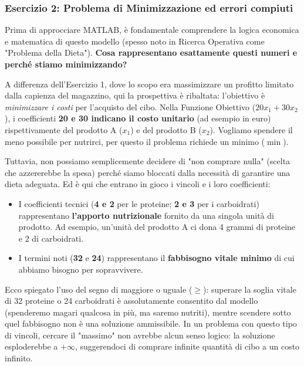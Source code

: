 \documentclass[12pt, a4paper]{article}
\begin{document}
	\vspace{0.6cm}
	
	\subsubsection*{Esercizio 2: Problema di Minimizzazione ed errori compiuti}
	Prima di approcciare MATLAB, è fondamentale comprendere la logica economica e matematica di questo modello (spesso noto in Ricerca Operativa come "Problema della Dieta"). \textbf{Cosa rappresentano esattamente questi numeri e perché stiamo minimizzando?} 
	
	A differenza dell'Esercizio 1, dove lo scopo era massimizzare un profitto limitato dalla capienza del magazzino, qui la prospettiva è ribaltata: l'obiettivo è \textit{minimizzare i costi} per l'acquisto del cibo. 
	Nella Funzione Obiettivo ($20x_1 + 30x_2$), i coefficienti \textbf{20 e 30 indicano il costo unitario} (ad esempio in euro) rispettivamente del prodotto A ($x_1$) e del prodotto B ($x_2$). Vogliamo spendere il meno possibile per nutrirci, per questo il problema richiede un minimo ($\min$).
	
	Tuttavia, non possiamo semplicemente decidere di "non comprare nulla" (scelta che azzererebbe la spesa) perché siamo bloccati dalla necessità di garantire una dieta adeguata. Ed è qui che entrano in gioco i vincoli e i loro coefficienti:
	\begin{itemize}
		\item I coefficienti tecnici (\textbf{4 e 2} per le proteine; \textbf{2 e 3} per i carboidrati) rappresentano \textbf{l'apporto nutrizionale} fornito da una singola unità di prodotto. Ad esempio, un'unità del prodotto A ci dona 4 grammi di proteine e 2 di carboidrati.
		\item I termini noti (\textbf{32} e \textbf{24}) rappresentano il \textbf{fabbisogno vitale minimo} di cui abbiamo bisogno per sopravvivere.
	\end{itemize}
	
	Ecco spiegato l'uso del segno di maggiore o uguale ($\geq$): superare la soglia vitale di 32 proteine o 24 carboidrati è assolutamente consentito dal modello (spenderemo magari qualcosa in più, ma saremo nutriti), mentre scendere sotto quel fabbisogno non è una soluzione ammissibile. 
	In un problema con questo tipo di vincoli, cercare il "massimo" non avrebbe alcun senso logico: la soluzione esploderebbe a $+\infty$, suggerendoci di comprare infinite quantità di cibo a un costo infinito.
	
\end{document}
